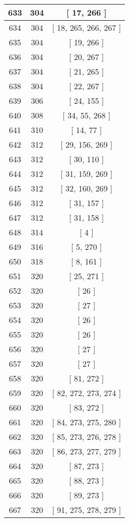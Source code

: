 \begin{center}
\begin{longtable}[H]{|| c c c ||}
\hline
633 & 304 & [ 17, 266 ] \\ 
\hline
634 & 304 & [ 18, 265, 266, 267 ] \\ 
\hline
635 & 304 & [ 19, 266 ] \\ 
\hline
636 & 304 & [ 20, 267 ] \\ 
\hline
637 & 304 & [ 21, 265 ] \\ 
\hline
638 & 304 & [ 22, 267 ] \\ 
\hline
639 & 306 & [ 24, 155 ] \\ 
\hline
640 & 308 & [ 34, 55, 268 ] \\ 
\hline
641 & 310 & [ 14, 77 ] \\ 
\hline
642 & 312 & [ 29, 156, 269 ] \\ 
\hline
643 & 312 & [ 30, 110 ] \\ 
\hline
644 & 312 & [ 31, 159, 269 ] \\ 
\hline
645 & 312 & [ 32, 160, 269 ] \\ 
\hline
646 & 312 & [ 31, 157 ] \\ 
\hline
647 & 312 & [ 31, 158 ] \\ 
\hline
648 & 314 & [ 4 ] \\ 
\hline
649 & 316 & [ 5, 270 ] \\ 
\hline
650 & 318 & [ 8, 161 ] \\ 
\hline
651 & 320 & [ 25, 271 ] \\ 
\hline
652 & 320 & [ 26 ] \\ 
\hline
653 & 320 & [ 27 ] \\ 
\hline
654 & 320 & [ 26 ] \\ 
\hline
655 & 320 & [ 26 ] \\ 
\hline
656 & 320 & [ 27 ] \\ 
\hline
657 & 320 & [ 27 ] \\ 
\hline
658 & 320 & [ 81, 272 ] \\ 
\hline
659 & 320 & [ 82, 272, 273, 274 ] \\ 
\hline
660 & 320 & [ 83, 272 ] \\ 
\hline
661 & 320 & [ 84, 273, 275, 280 ] \\ 
\hline
662 & 320 & [ 85, 273, 276, 278 ] \\ 
\hline
663 & 320 & [ 86, 273, 277, 279 ] \\ 
\hline
664 & 320 & [ 87, 273 ] \\ 
\hline
665 & 320 & [ 88, 273 ] \\ 
\hline
666 & 320 & [ 89, 273 ] \\ 
\hline
667 & 320 & [ 91, 275, 278, 279 ] \\ 

\end{longtable}
\end{center}
